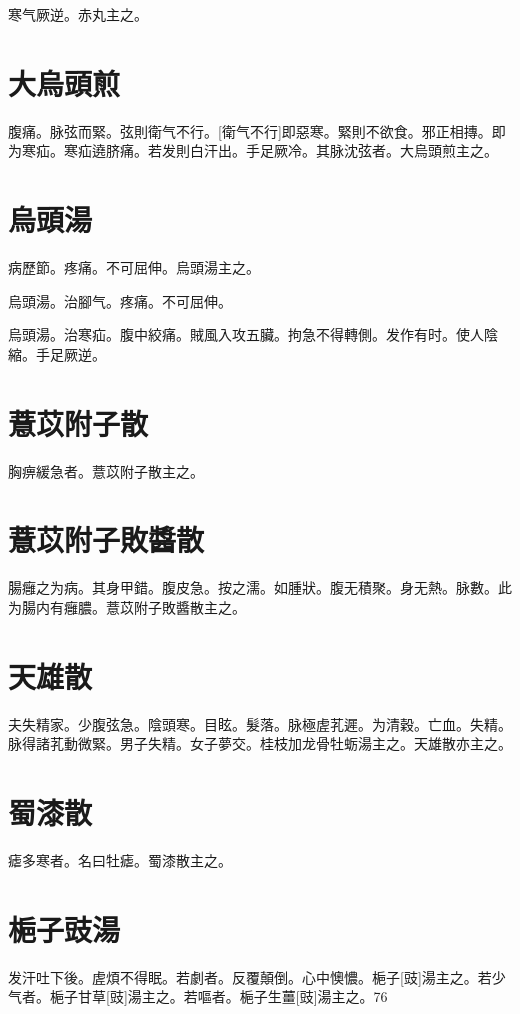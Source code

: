 \documentclass[12pt,twoside,UTF8,b5paper]{ctexbook}
\begin{document}
寒气厥逆。赤丸主之。

\section{大烏頭煎}

腹痛。脉弦而緊。弦則衛气不行。[衛气不行]即惡寒。緊則不欲食。邪正相摶。即为寒疝。寒疝遶脐痛。若发則白汗出。手足厥冷。其脉沈弦者。大烏頭煎主之。

\section{烏頭湯}

病歷節。疼痛。不可屈伸。烏頭湯主之。

烏頭湯。治腳气。疼痛。不可屈伸。

烏頭湯。治寒疝。腹中絞痛。賊風入攻五臟。拘急不得轉側。发作有时。使人陰縮。手足厥逆。

\section{薏苡附子散}

胸痹緩急者。薏苡附子散主之。

\section{薏苡附子敗醬散}

腸癰之为病。其身甲錯。腹皮急。按之濡。如腫狀。腹无積聚。身无熱。脉數。此为腸内有癰膿。薏苡附子敗醬散主之。

\section{天雄散}

夫失精家。少腹弦急。陰頭寒。目眩。髮落。脉極虗芤遲。为清穀。亡血。失精。脉得諸芤動微緊。男子失精。女子夢交。桂枝加龙骨牡蛎湯主之。天雄散亦主之。

\section{蜀漆散}

瘧多寒者。名曰牡瘧。蜀漆散主之。

\section{梔子豉湯}

发汗吐下後。虗煩不得眠。若劇者。反覆顛倒。心中懊憹。梔子[豉]湯主之。若少气者。梔子甘草[豉]湯主之。若嘔者。梔子生薑[豉]湯主之。76
\end{document}
